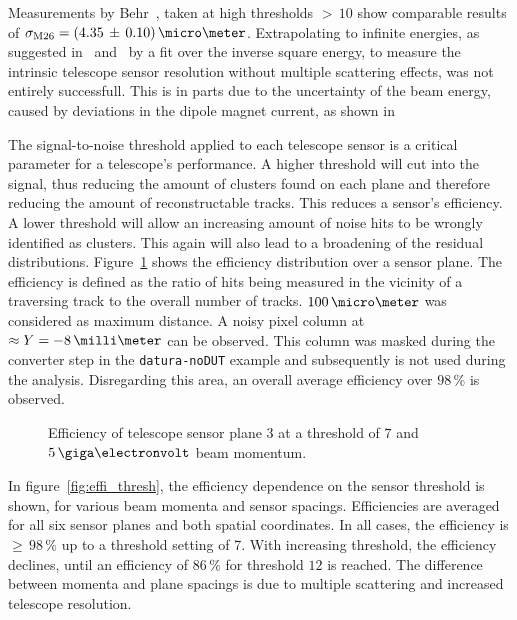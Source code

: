 Measurements by Behr~\cite{ref:j.behrmeasurements}, taken at high thresholds
$>\,10$ show comparable results of $\sigma_{\textrm{M26}} =
(4.35\,\pm\,0.10)\,\micro\meter$. Extrapolating to infinite energies, as
suggested in~\cite{ref:cmosbeamtest} and~\cite{ref:moritzthesis} by a fit over
the inverse square energy, to measure the intrinsic telescope sensor resolution
without multiple scattering effects, was not entirely successfull. 
This is in
parts due to the uncertainty of the beam energy, caused by deviations in the
dipole magnet current, as shown in~\cite{ref:summerstudentbrm}

The signal-to-noise threshold applied to each telescope sensor is a critical
parameter for a telescope's performance. A higher threshold will cut into the
signal, thus reducing the amount of clusters found on each plane and therefore
reducing the amount of reconstructable tracks. This reduces a sensor's
efficiency. A lower threshold will allow an increasing amount of noise hits to
be wrongly identified as clusters. This again will also lead to a broadening of
the residual distributions. Figure~\ref{fig:effi} shows the efficiency
distribution over a sensor plane. The efficiency is defined as the ratio of hits
being measured in the vicinity of a traversing track to the overall number of
tracks. $100\,\micro\meter$ was considered as maximum distance. A noisy pixel
column at $\approx Y = -8\,\milli\meter$ can be observed. This column was masked
during the converter step in the \texttt{datura-noDUT} example and subsequently
is not used during the analysis. Disregarding this area, an overall average
efficiency over $98\,\%$ is observed.

\begin{figure}[hbtp]
\centering
\caption[Telescope sensor efficiency]{Efficiency of telescope sensor plane $3$
at a threshold of $7$ and $5\,\giga\electronvolt$ beam momentum.}
\label{fig:effi}
\end{figure}

In figure~\ref{fig:effi_thresh}, the efficiency dependence on the sensor
threshold is shown, for various beam momenta and sensor spacings. Efficiencies
are averaged for all six sensor planes and both spatial coordinates. In all
cases, the efficiency is $\ge\,98\,\%$ up to a threshold setting of 7. With
increasing threshold, the efficiency declines, until an efficiency of $86\,\%$
for threshold $12$ is reached. The difference between momenta and plane spacings
is due to multiple scattering and increased telescope resolution.

